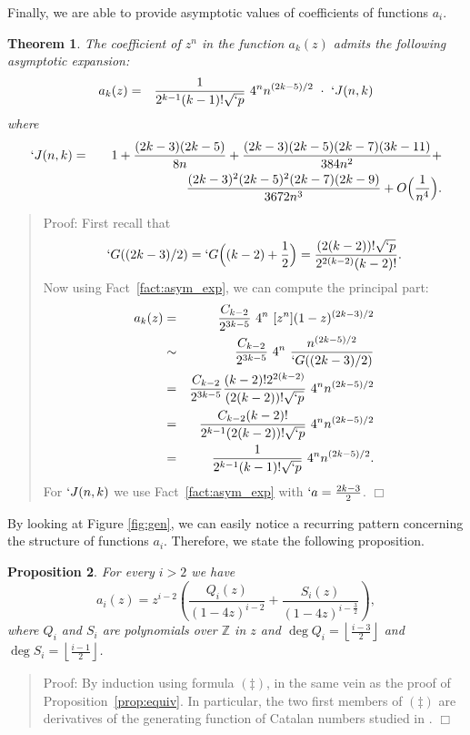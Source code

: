\documentclass{jfp1}
\newenvironment{proof}[1]{\begin{quotation}\noindent\textsf{Proof:} #1}
{\(\Box\)\end{quotation}}
\newtheorem{theo}{Theorem}
\newtheorem{prop}[theo]{Proposition}
\begin{document}
Finally, we are able to provide asymptotic values of coefficients of functions $a_i$.

\begin{theo}
The coefficient of $z^n$ in the function $a_k(z)$ admits the following asymptotic expansion:
    \begin{eqnarray*}
      [z^n] a_k(z) &= &\frac{1}{2^{k-1} (k-1)! \sqrt{`p}} \ 4^nn^{(2k-5)/2} \ \cdot \ `J(n,k)
  \end{eqnarray*}
where
\begin{eqnarray*}
  `J(n,k)&=& \quad 1 + \frac{(2k-3)(2k-5)}{8n} +
  \frac{(2k-3)(2k-5)(2k-7)(3k-11)}{384n^2} + \\
&& \quad \frac{(2k-3)^2(2k-5)^2(2k-7)(2k-9)}{3672n^3}
  + O\Big(\frac{1}{n^4}\Big).
\end{eqnarray*}
\end{theo}
  \begin{proof}
First recall that
\[`G((2k-3)/2) = `G\Big((k-2)+\frac{1}{2}\Big) = \frac{(2(k-2))!\sqrt{`p}}{2^{2(k-2)} (k-2)!}.\]
Now using Fact~\ref{fact:asym_exp}, we can compute the principal  part:
\begin{eqnarray*}
  [z^n]a_k(z) &=& \frac{C_{k-2}}{2^{3k-5}}\ 4^n \ [z^n](1-z)^{(2k-3)/2}\\
  &\sim&\frac{C_{k-2}}{2^{3k-5}}\ 4^n \ \frac{n^{(2k-5)/2}}{`G((2k-3)/2)}\\
  &=& \frac{C_{k-2}}{2^{3k-5}} \frac{(k-2)! 2^{2(k-2)}}{(2(k-2))! \sqrt{`p}}\
  4^nn^{(2k-5)/2}\\
&=& \frac{C_{k-2} (k-2)!}{2^{k-1} (2(k-2))! \sqrt{`p}} \ 4^nn^{(2k-5)/2}\\
&=& \frac{1}{2^{k-1} (k-1)! \sqrt{`p}} \ 4^nn^{(2k-5)/2}.
\end{eqnarray*}
For $`J(n,k)$ we use Fact~\ref{fact:asym_exp} with $`a = \frac{2k-3}{2}$.
  \end{proof}




By looking at Figure \ref{fig:gen}, we can easily notice a recurring pattern concerning the structure of functions $a_i$. Therefore, we state the following proposition.

\begin{prop}\label{prop:Q_R}
For every $i > 2$ we have
\[a_i(z) = z^{i-2} \left( \frac{Q_i(z)}{(1-4z)^{i-2}} + \frac{S_i(z)}{(1-4z)^{i-\frac{3}{2}}} \right), \]
where $Q_i$ and $S_i$ are polynomials over ${\mathbb Z}$ in $z$ and $\deg Q_i = \left\lfloor \frac{i-3}{2} \right\rfloor$ and $\deg S_i = \left\lfloor \frac{i-1}{2} \right\rfloor$.
\end{prop}
\begin{proof}
  By induction using  formula $(\ddagger)$, in the same vein as the proof of
  Proposition~\ref{prop:equiv}.  In particular, the two first members of $(\ddagger)$ are
  derivatives of the generating function of Catalan numbers studied in \cite{lang02:_polyn_cataly}.
\end{proof}
\end{document}
